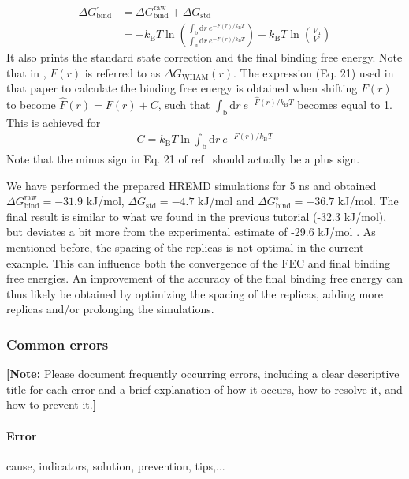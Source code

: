 \begin{equation}
  \begin{aligned}
    \Delta G_{\text{bind}}^{\circ} & = \Delta G_{\text{bind}}^{\text{raw}} + \Delta G_{\text{std}}  \\
                            & = -k_{\text{B}} T \ln \left ( \frac{\int_{\text{b}} \mathrm{d}r\: e^{-F(r)/k_{\text{B}} T}}{\int_{\text{u}} \mathrm{d}r\: e^{-F(r)/k_{\text{B}} T}} \right ) -k_{\text{B}} T \ln \left( \frac{V_{\text{u}}}{V^{\circ}} \right )
  \end{aligned}
\end{equation}
%
It also prints the standard state correction and the final binding free energy. 
Note that in \cite{deRuiter_2013}, $F(r)$ is referred to as $\Delta G_{\text{WHAM}}(r)$. The expression (Eq. 21) used in that paper to calculate the binding free energy is obtained when shifting $F(r)$ to become $\hat{F}(r) = F(r) + C$, such that $\int_{\text{b}} \mathrm{d}r\: e^{-\hat{F}(r)/k_{\text{B}} T}$ becomes equal to 1. This is achieved for 
\begin{equation}
  \begin{aligned}
    C = k_{\text{B}}T \ln \int_{\text{b}} \mathrm{d}r\: e^{-F(r)/k_{\text{B}} T}
  \end{aligned}
\end{equation}
Note that the minus sign in Eq. 21 of ref~\cite{deRuiter_2013} should actually be a plus sign.

We have performed the prepared HREMD simulations for 5 ns and obtained $\Delta G^{\text{raw}}_{\text{bind}}=-31.9$ kJ/mol, $\Delta G_{\text{std}}=-4.7$ kJ/mol and $\Delta G^{\circ}_{\text{bind}}=-36.7$ kJ/mol. The final result is similar to what we found in the previous tutorial (-32.3 kJ/mol), but deviates a bit more from the experimental estimate of -29.6 kJ/mol \cite{Singh2005}.
As mentioned before, the spacing of the replicas is not optimal in the current example. 
This can influence both the convergence of the FEC and final binding free energies.
An improvement of the accuracy of the final binding free energy can thus likely be obtained by optimizing the spacing of the replicas, adding more replicas and/or prolonging the simulations.

\subsubsection{Common errors}
\textbf{[Note:} Please document frequently occurring errors, including a clear descriptive title for each error and a brief explanation of how it occurs, how to resolve it, and how to prevent it.\textbf{]}

\paragraph{Error}
cause, indicators, solution, prevention, tips,...


